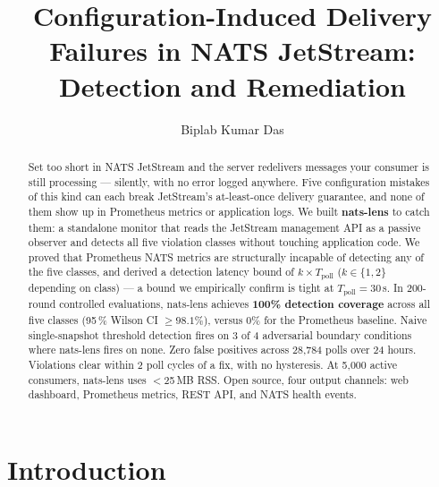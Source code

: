 \documentclass[sigconf,nonacm]{acmart}
\begin{document}
\title{Configuration-Induced Delivery Failures in NATS JetStream:\\
  Detection and Remediation}

\author{Biplab Kumar Das}

\begin{abstract}
Set  too short in NATS JetStream and the server redelivers
messages your consumer is still processing --- silently, with no error
logged anywhere. Five configuration mistakes of this kind can each break
JetStream's at-least-once delivery guarantee, and none of them show up
in Prometheus metrics or application logs. We built \textbf{nats-lens}
to catch them: a standalone monitor that reads the JetStream management
API as a passive observer and detects all five violation classes without
touching application code.
We proved that Prometheus NATS metrics are structurally incapable of
detecting any of the five classes, and derived a detection latency bound
of $k \times T_\mathrm{poll}$ ($k \in \{1,2\}$ depending on class) ---
a bound we empirically confirm is tight at $T_\mathrm{poll}{=}30$\,s.
In 200-round controlled evaluations, nats-lens achieves
\textbf{100\% detection coverage} across all five classes
(95\,\% Wilson CI $\geq 98.1\%$), versus 0\% for the Prometheus baseline.
Naive single-snapshot threshold detection fires on 3 of 4 adversarial
boundary conditions where nats-lens fires on none. Zero false positives
across 28,784 polls over 24 hours. Violations clear within 2 poll cycles
of a fix, with no hysteresis. At 5{,}000 active consumers, nats-lens
uses $<$25\,MB RSS. Open source, four output channels: web dashboard,
Prometheus metrics, REST API, and NATS health events.
\end{abstract}


\maketitle

\section{Introduction}
\end{document}
